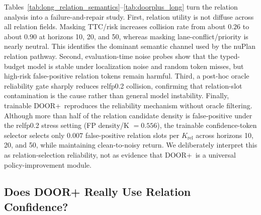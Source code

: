 \documentclass[10pt,journal,compsoc]{IEEEtran}
\newcommand{\doorplus}{\textsc{DOOR+}}
\begin{document}
\begin{table}[!t]
\caption{Long-horizon confirmation for trainable \doorplus\ under false-positive relation noise. Selected-FP-Rel@K remains near zero across horizons despite high false-positive candidate density.}
\label{tab:doorplus_long}
\centering
{}
\end{table}

Tables~\ref{tab:long_relation_semantics}--\ref{tab:doorplus_long} turn the relation analysis into a failure-and-repair study. First, relation utility is not diffuse across all relation fields. Masking TTC/risk increases collision rate from about $0.26$ to about $0.90$ at horizons 10, 20, and 50, whereas masking lane-conflict/priority is nearly neutral. This identifies the dominant semantic channel used by the nuPlan relation pathway. Second, evaluation-time noise probes show that the typed-budget model is stable under localization noise and random token misses, but high-risk false-positive relation tokens remain harmful. Third, a post-hoc oracle reliability gate sharply reduces relfp0.2 collision, confirming that relation-slot contamination is the cause rather than general model instability. Finally, trainable \doorplus\ reproduces the reliability mechanism without oracle filtering. Although more than half of the relation candidate density is false-positive under the relfp0.2 stress setting (FP density/K $=0.556$), the trainable confidence-token selector selects only $0.007$ false-positive relation slots per $K_{\mathrm{rel}}$ across horizons 10, 20, and 50, while maintaining clean-to-noisy return. We deliberately interpret this as relation-selection reliability, not as evidence that \doorplus\ is a universal policy-improvement module.

\subsection{Does DOOR+ Really Use Relation Confidence?}
\end{document}
